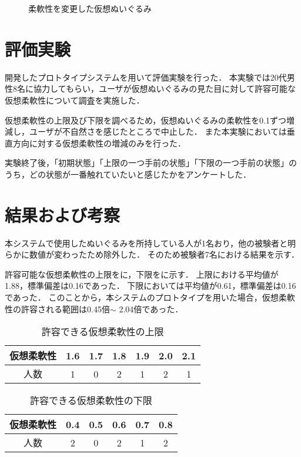 \documentclass[uplatex]{jsarticle}   %
\begin{document}
    \begin{figure}[t]
        \centering
        \caption{柔軟性を変更した仮想ぬいぐるみ}\label{fig:sinshuku}
    \end{figure}


\section{評価実験}
開発したプロトタイプシステムを用いて評価実験を行った．
本実験では20代男性8名に協力してもらい，ユーザが仮想ぬいぐるみの見た目に対して許容可能な仮想柔軟性について調査を実施した．

仮想柔軟性の上限及び下限を調べるため，仮想ぬいぐるみの柔軟性を0.1ずつ増減し，ユーザが不自然さを感じたところで中止した．
また本実験においては垂直方向に対する仮想柔軟性の増減のみを行った．

実験終了後，「初期状態」「上限の一つ手前の状態」「下限の一つ手前の状態」のうち，どの状態が一番触れていたいと感じたかをアンケートした．


\section{結果および考察}
本システムで使用したぬいぐるみを所持している人が1名おり，他の被験者と明らかに数値が変わったため除外した．
そのため被験者7名における結果を示す．

    許容可能な仮想柔軟性の上限をに，下限をに示す．
    上限における平均値が1.88，標準偏差は0.16であった．
    下限においては平均値が0.61，標準偏差は0.16であった．
    このことから，本システムのプロトタイプを用いた場合，仮想柔軟性の許容される範囲は0.45倍$\sim$ 2.04倍であった．
    

    \begin{table}[t]
        \caption{\label{tab:result1}許容できる仮想柔軟性の上限}
        \centering
        \begin{tabular}{c|c|c|c|c|c|c}
            \hline
            \hline
            仮想柔軟性 &1.6 &1.7 &1.8 &1.9 &2.0 &2.1 \\
            \hline
            人数 &1 &0 &2 &1 &2 &1 \\
            \hline
        \end{tabular}
    \end{table}
    
    \begin{table}[t]
        \caption{\label{tab:result2}許容できる仮想柔軟性の下限}
        \centering
        \begin{tabular}{c|c|c|c|c|c}
            \hline
            \hline
            仮想柔軟性 &0.4 &0.5 &0.6 &0.7 &0.8 \\
            \hline
            人数 &2 &0 &2 &1 &2\\
            \hline
        \end{tabular}
    \end{table}
\end{document}
